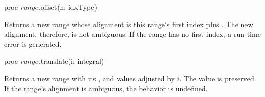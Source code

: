 \begin{protohead}
proc $range$.offset(n: idxType)
\end{protohead}
\label{Range_Offset_Method}
\begin{protobody}
Returns a new range whose alignment is this range's first index plus
. The new alignment, therefore, is not ambiguous.
If the range has no first index, a run-time error is generated.
\end{protobody}

\begin{protohead}
proc $range$.translate(i: integral)
\end{protohead}
\begin{protobody}
Returns a new range with its ,  and  values
adjusted by $i$.  The  value is preserved.
If the range's alignment is ambiguous, the behavior is undefined.
\end{protobody}

\begin{protohead}
\end{protohead}
\begin{protobody}
\end{protobody}

